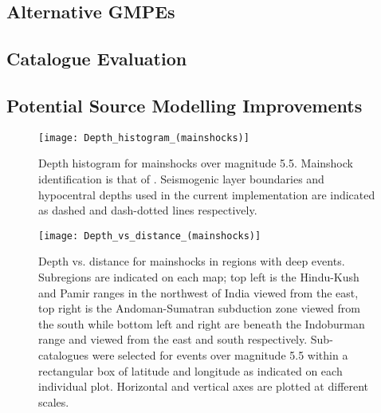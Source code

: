 \documentclass{article}
\begin{document}
\begin{appendices}

\section{}
\label{sec:Appendices}

\subsection{Alternative GMPEs}
\label{appendix:AlternativeGmpes}

\subsection{Catalogue Evaluation}
\label{appendix:Catalogue}


\subsection{Potential Source Modelling Improvements}
\label{appendix:SourceModelImprovements}

\begin{figure}[htb]
\begin{adjustbox}{center}
\texttt{[image: Depth\_histogram\_(mainshocks)]}
\end{adjustbox}
\caption[Depth histogram for mainshocks]{Depth histogram for mainshocks over magnitude 5.5. Mainshock identification is that of \cite{nath2010earthquake}. Seismogenic layer boundaries and hypocentral depths used in the current implementation are indicated as dashed and dash-dotted lines respectively.}
\label{fig:DepthHistogram}
\end{figure}

\begin{figure}[!htb]
\begin{adjustbox}{center}
\texttt{[image: Depth\_vs\_distance\_(mainshocks)]}
\end{adjustbox}
\caption[Depth vs. distance for mainshocks in regions with deep events]{Depth vs. distance for mainshocks in regions with deep events. Subregions are indicated on each map; top left is the Hindu-Kush and Pamir ranges in the northwest of India viewed from the east, top right is the Andoman-Sumatran subduction zone viewed from the south while bottom left and right are beneath the Indoburman range and viewed from the east and south respectively. Sub-catalogues were selected for events over magnitude 5.5 within a rectangular box of latitude and longitude as indicated on each individual plot.  Horizontal and vertical axes are plotted at different scales.}
\label{fig:DepthVsDistance}
\end{figure}


\end{appendices}
\end{document}
